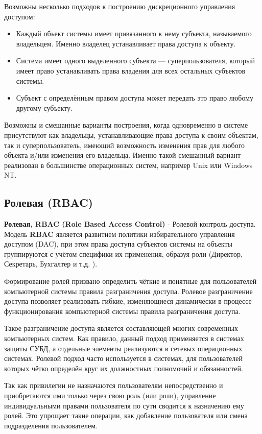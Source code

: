 Возможны несколько подходов к построению дискреционного управления доступом:
\begin{itemize}
\item Каждый объект системы имеет привязанного к нему субъекта, называемого владельцем. Именно владелец устанавливает права доступа к объекту.
\item Система имеет одного выделенного субъекта — суперпользователя, который имеет право устанавливать права владения для всех остальных субъектов системы.
\item Субъект с определённым правом доступа может передать это право любому другому субъекту.
\end{itemize}

Возможны и смешанные варианты построения, когда одновременно в системе присутствуют как владельцы, устанавливающие права доступа к своим объектам, так и суперпользователь, имеющий возможность изменения прав для любого объекта и/или изменения его владельца. Именно такой смешанный вариант реализован в большинстве операционных систем, например Unix или Windows NT.

\subsection{Ролевая (RBAC)}
\textbf{Ролевая, RBAC (Role Based Access Control)} - Ролевой контроль доступа. Модель \textbf{RBAC} является развитием политики избирательного управления доступом (DAC), при этом права доступа субъектов системы на объекты группируются с учётом специфики их применения, образуя роли (Директор, Секретарь, Бухгалтер и т.д. ).

Формирование ролей призвано определить чёткие и понятные для пользователей компьютерной системы правила разграничения доступа. Ролевое разграничение доступа позволяет реализовать гибкие, изменяющиеся динамически в процессе функционирования компьютерной системы правила разграничения доступа.

Такое разграничение доступа является составляющей многих современных компьютерных систем. Как правило, данный подход применяется в системах защиты СУБД, а отдельные элементы реализуются в сетевых операционных системах. Ролевой подход часто используется в системах, для пользователей которых чётко определён круг их должностных полномочий и обязанностей.

Так как привилегии не назначаются пользователям непосредственно и приобретаются ими только через свою роль (или роли), управление индивидуальными правами пользователя по сути сводится к назначению ему ролей. Это упрощает такие операции, как добавление пользователя или смена подразделения пользователем.

